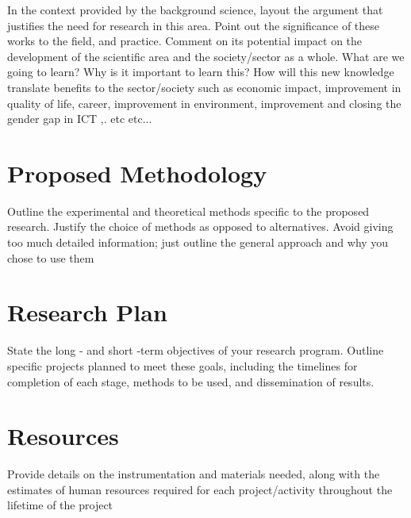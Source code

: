 \documentclass{article}
\begin{document}
In the context provided by the background science, layout the argument that justifies the need for research in this area. Point out the significance of these works to the field, and practice. Comment on its potential impact on the development of the scientific area and the society/sector as a whole. What are we going to learn? Why is it important to learn this? How will this new knowledge translate benefits to the sector/society such as economic impact, improvement in quality of life, career, improvement in environment, improvement and closing the gender gap in ICT ,. etc etc...

\section{Proposed Methodology}
Outline the experimental and theoretical methods specific to the proposed research. Justify the choice of methods as opposed to alternatives. Avoid giving too much detailed information; just outline the general approach and why you chose to use them

\section{Research Plan}
State the long - and short -term objectives of your research program. Outline specific projects planned to meet these goals, including the timelines for completion of each stage, methods to be used, and dissemination of results. 

\section{Resources}
Provide details on the instrumentation and materials needed, along with the estimates of human resources required for each project/activity throughout the lifetime of the project
\end{document}
